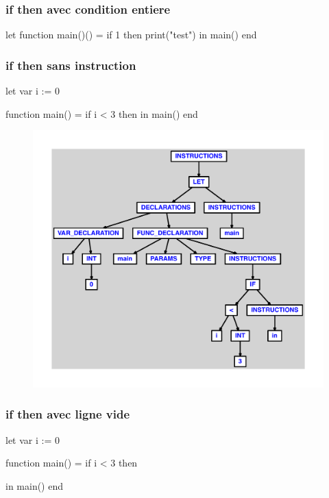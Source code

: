 \documentclass{article}
\begin{document}
\subsubsection{if then avec condition entiere}
\begin{verbatimtab}
let
	function main()() =
		if 1 then
			print("test")
in main() end
\end{verbatimtab}
\subsubsection{if then sans instruction}
\begin{verbatimtab}
let
	var i := 0

	function main() =
		if i < 3 then
in main() end
\end{verbatimtab}
\begin{figure}[H]\centering\includegraphics[max width=\textwidth]{ast/ast_249.pdf}\end{figure}\subsubsection{if then avec ligne vide}
\begin{verbatimtab}
let
	var i := 0

	function main() =
		if i < 3 then

in main() end
\end{verbatimtab}
\end{document}
